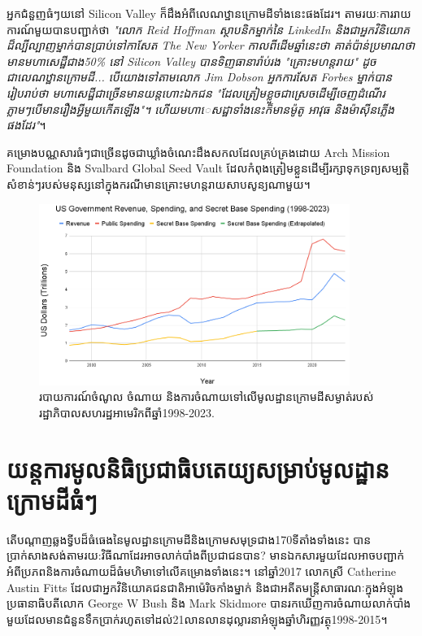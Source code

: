 \documentclass[10pt,twocolumn,letterpaper]{article}
\begin{document}
	អ្នកជំនួញធំៗយនៅ Silicon Valley ក៏ដឹងអំពីលេណឋ្ឋានក្រោមដីទាំងនេះផងដែរ។ តាមរយៈការរាយការណ៍មួយបានបញ្ជាក់ថា \textit{"លោក Reid Hoffman ស្ថាបនិកម្នាក់នៃ LinkedIn និងជាអ្នកវិនិយោគដ៏ល្បីល្បាញម្នាក់បានប្រាប់ទៅកាសែត The New Yorker កាលពីដើមឆ្នាំនេះថា គាត់ប៉ាន់ប្រមាណថាមានមហាសេដ្ឋីជាង50\% នៅ Silicon Valley បានទិញធានារ៉ាប់រង "គ្រោះមហន្តរាយ" ដូចជាលេណឋ្ឋានក្រោមដី... បើយោងទៅតាមលោក Jim Dobson អ្នកការសែត Forbes ម្នាក់បានរៀបរាប់ថា មហាសេដ្ឋីជាច្រើនមានយន្តហោះឯកជន "ដែលត្រៀមខ្លួចជាស្រេចដើម្បីចេញដំណើរភ្លាមៗបើមានរឿងអ្វីមួយកើតឡើង"។ ហើយមហាេសដ្ឋាទាំងនេះក៏មានម៉ូតូ អាវុធ និងម៉ាស៊ីនភ្លើងផងដែរ"}\cite{28}។

	គម្រោងបណ្ណសារធំៗជាច្រើនដូចជាឃ្លាំងចំណេះដឹងសកលដែលគ្រប់គ្រងដោយ Arch Mission Foundation\cite{29} និង Svalbard Global Seed Vault\cite{30} ដែលកំពុងត្រៀមខ្លួនដើម្បីរក្សាទុកទ្រព្យសម្បត្តិសំខាន់ៗរបស់មនុស្សនៅក្នុងករណីមានគ្រោះមហន្តរាយសាបសូន្យណាមួយ។
\begin{figure}[t]
\begin{center}
\includegraphics[width=0.9\textwidth]{govcrop2.png}
\end{center}
   \caption{របាយការណ៍ចំណូល ចំណាយ និងការចំណាយទៅលើមូលដ្ឋានក្រោមដីសម្ងាត់របស់រដ្ឋាភិបាលសហរដ្ឋអាមេរិកពីឆ្នាំ1998-2023\cite{19}.}
   \label{fig:9}
\end{figure}
\section{យន្តការមូលនិធិប្រជាធិបតេយ្យសម្រាប់មូលដ្ឋានក្រោមដីធំៗ}

	តើបណ្តាញឆ្លងទ្វីបដ៏ធំធេងនៃមូលដ្ឋានក្រោមដីនិងក្រោមសមុទ្រជាង170ទីតាំងទាំងនេះ បានប្រាក់សាងសង់តាមរយ:វិធីណាដែរអាចលាក់បាំងពីប្រជាជនបាន? មានឯកសារមួយដែលអាចបញ្ជាក់អំពីប្រភពនិងការចំណាយដ៏ធំមហិមាទៅលើគម្រោងទាំងនេះ។ នៅឆ្នាំ2017 លោកស្រី​ Catherine Austin Fitts ដែលជាអ្នកវិនិយោគជនជាតិអាម៉េរិចកាំងម្នាក់ និងជាអតីតមន្ត្រីសាធារណៈក្នុងអំឡុងប្រធានាធិបតីលោក George W Bush និង Mark Skidmore បានរកឃើញការចំណាយលាក់បាំងមួយដែលមានជំនួនទឹកប្រាក់រហូតទៅដល់21លានលានដុល្លារនាអំឡុងឆ្នាំហិរញ្ញវត្ថុ1998-2015\cite{11,12,13}។
\end{document}

